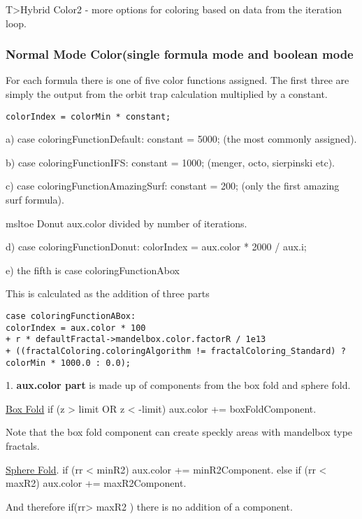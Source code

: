 T>Hybrid Color2 - more options for coloring based on data from the iteration loop.

\subsubsection{Normal Mode Color(single formula mode and boolean mode}\label{materials-normal-mode-color}

For each formula there is one of five color functions assigned. The first three are simply the output from the orbit trap calculation multiplied by a constant.

\begin{lstlisting}
colorIndex = colorMin * constant;
\end{lstlisting}
	

a) case coloringFunctionDefault: constant = 5000; (the most commonly assigned).

b) case coloringFunctionIFS: constant = 1000; (menger, octo, sierpinski etc).

c) case coloringFunctionAmazingSurf: constant = 200; (only the first amazing surf formula).

msltoe Donut aux.color divided by number of iterations.

d) case coloringFunctionDonut: colorIndex = aux.color * 2000 / aux.i;

e) the fifth is case coloringFunctionAbox

This is calculated as the addition of three parts

\begin{lstlisting}
case coloringFunctionABox:
colorIndex = aux.color * 100 
+ r * defaultFractal->mandelbox.color.factorR / 1e13 
+ ((fractalColoring.coloringAlgorithm != fractalColoring_Standard) ? colorMin * 1000.0 : 0.0); 
\end{lstlisting}

1. \textbf{aux.color part} is made up of components from the box fold and sphere fold.

\underline{Box Fold}
if  (z  >  limit  OR  z  <   -limit)   aux.color +=  boxFoldComponent.

Note that the box fold component can create  speckly areas with mandelbox type fractals.

\underline{Sphere Fold}. 
if (rr < minR2)    aux.color +=  minR2Component.
else if (rr < maxR2)    aux.color +=  maxR2Component.

And therefore  if(rr> maxR2 ) there is no addition of a component.

